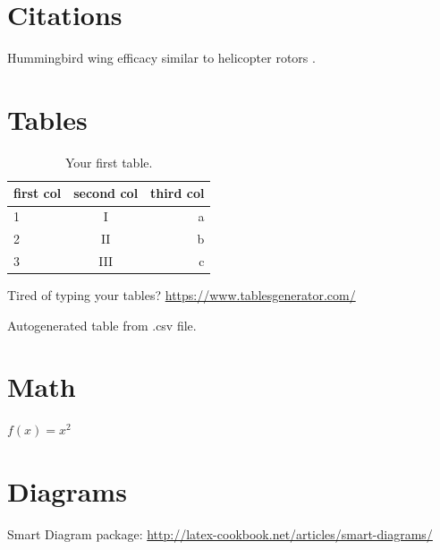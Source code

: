 \documentclass{article}
\begin{document}
\section{Citations}
Hummingbird wing efficacy similar to helicopter rotors \cite{Kruyt20140585}.


\section{Tables}

\begin{table}[h!]
  \begin{center}
    \caption{Your first table.}
    \label{table1}
    \begin{tabular}{l|c|r} %
      \textbf{first col} & \textbf{second col} & \textbf{third col}\\
      \hline
      1 & I & a\\
      2 & II & b\\
      3 & III & c\\
    \end{tabular}
  \end{center}
\end{table}

%
Tired of typing your tables? \url{https://www.tablesgenerator.com/}

\begin{table}
\centering
\caption{Autogenerated table from .csv file.}
\label{table1}
\end{table}

\section{Math}

$f(x) = x^2$


\section{Diagrams}
Smart Diagram package: \url{http://latex-cookbook.net/articles/smart-diagrams/}

\vspace{20pt}

\centering
{}
\end{document}
